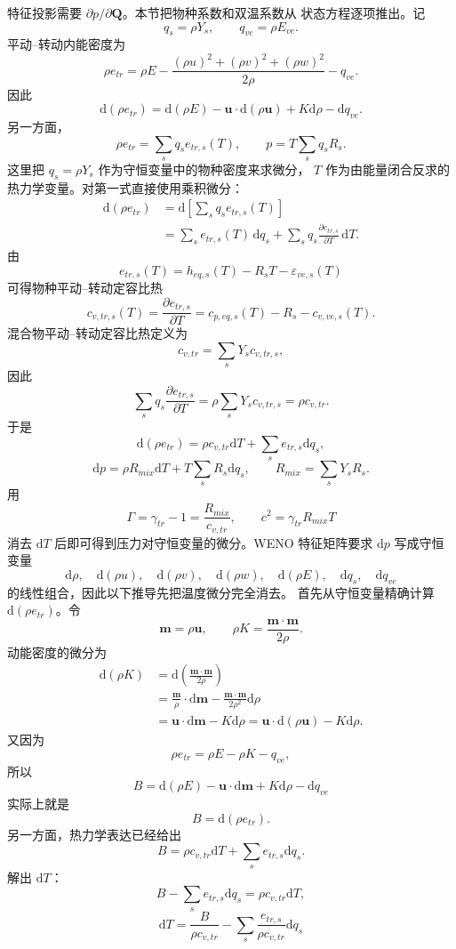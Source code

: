 \documentclass[11pt,a4paper,fontset=fandol]{ctexart}
\newcommand{\dd}{\mathrm{d}}
\newcommand{\ve}{ve}
\newcommand{\tr}{tr}
\newcommand{\uu}{\bm{u}}
\newcommand{\QQ}{\bm{Q}}
\newcommand{\Gammaone}{\Gamma}
\begin{document}
特征投影需要 \(\partial p/\partial \QQ\)。本节把物种系数和双温系数从
状态方程逐项推出。记
\[
q_s=\rho Y_s,\qquad q_{\ve}=\rho E_{\ve}.
\]
平动--转动内能密度为
\[
\rho e_{\tr}=\rho E-\frac{(\rho u)^2+(\rho v)^2+(\rho w)^2}{2\rho}-q_{\ve}.
\]
因此
\[
\dd(\rho e_{\tr})
=\dd(\rho E)-\uu\cdot\dd(\rho\uu)+K\dd\rho-\dd q_{\ve}.
\]
另一方面，
\[
\rho e_{\tr}=\sum_s q_s e_{\tr,s}(T),
\qquad
p=T\sum_s q_sR_s .
\]
这里把 \(q_s=\rho Y_s\) 作为守恒变量中的物种密度来求微分，
\(T\) 作为由能量闭合反求的热力学变量。对第一式直接使用乘积微分：
\[
\begin{aligned}
\dd(\rho e_{\tr})
&=\dd\left[\sum_s q_s e_{\tr,s}(T)\right] \\
&=\sum_s e_{\tr,s}(T)\,\dd q_s
  +\sum_s q_s \frac{\partial e_{\tr,s}}{\partial T}\,\dd T .
\end{aligned}
\]
由
\[
e_{\tr,s}(T)=h_{eq,s}(T)-R_sT-\varepsilon_{\ve,s}(T)
\]
可得物种平动--转动定容比热
\[
c_{v,\tr,s}(T)
=\frac{\partial e_{\tr,s}}{\partial T}
=c_{p,eq,s}(T)-R_s-c_{v,\ve,s}(T).
\]
混合物平动--转动定容比热定义为
\[
c_{v,\tr}=\sum_sY_s c_{v,\tr,s},
\]
因此
\[
\sum_s q_s \frac{\partial e_{\tr,s}}{\partial T}
=\rho\sum_sY_s c_{v,\tr,s}
=\rho c_{v,\tr}.
\]
于是
\[
\dd(\rho e_{\tr})
=\rho c_{v,\tr}\dd T+\sum_s e_{\tr,s}\dd q_s,
\]
\[
\dd p=\rho R_{mix}\dd T+T\sum_sR_s\dd q_s,
\qquad
R_{mix}=\sum_sY_sR_s .
\]
用
\[
\Gammaone=\gamma_{\tr}-1=\frac{R_{mix}}{c_{v,\tr}},
\qquad
c^2=\gamma_{\tr}R_{mix}T
\]
消去 \(\dd T\) 后即可得到压力对守恒变量的微分。WENO 特征矩阵要求
\(\dd p\) 写成守恒变量
\[
\dd\rho,\quad \dd(\rho u),\quad \dd(\rho v),\quad
\dd(\rho w),\quad \dd(\rho E),\quad \dd q_s,\quad \dd q_{\ve}
\]
的线性组合，因此以下推导先把温度微分完全消去。
首先从守恒变量精确计算 \(\dd(\rho e_{\tr})\)。令
\[
\bm{m}=\rho\uu,\qquad
\rho K=\frac{\bm{m}\cdot\bm{m}}{2\rho}.
\]
动能密度的微分为
\[
\begin{aligned}
\dd(\rho K)
&=\dd\left(\frac{\bm{m}\cdot\bm{m}}{2\rho}\right)\\
&=\frac{\bm{m}}{\rho}\cdot\dd\bm{m}
  -\frac{\bm{m}\cdot\bm{m}}{2\rho^2}\dd\rho\\
&=\uu\cdot\dd\bm{m}-K\dd\rho
 =\uu\cdot\dd(\rho\uu)-K\dd\rho .
\end{aligned}
\]
又因为
\[
\rho e_{\tr}=\rho E-\rho K-q_{\ve},
\]
所以
\[
B=\dd(\rho E)-\uu\cdot\dd\bm{m}+K\dd\rho-\dd q_{\ve}
\]
实际上就是
\[
\boxed{B=\dd(\rho e_{\tr})}.
\]
另一方面，热力学表达已经给出
\[
B=\rho c_{v,\tr}\dd T+\sum_s e_{\tr,s}\dd q_s .
\]
解出 \(\dd T\)：
\[
B-\sum_s e_{\tr,s}\dd q_s
=\rho c_{v,\tr}\dd T,
\]
\[
\boxed{
\dd T
=\frac{B}{\rho c_{v,\tr}}
-\sum_s\frac{e_{\tr,s}}{\rho c_{v,\tr}}\dd q_s
}
\]
\end{document}
